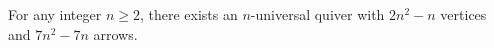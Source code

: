 \begin{theorem}
\label{thm:main-thm-quivers}
For any integer $n\ge 2$, there exists an $n$-universal quiver with $2n^2-n$ vertices and $7n^2-7n$ arrows. 
\end{theorem}
